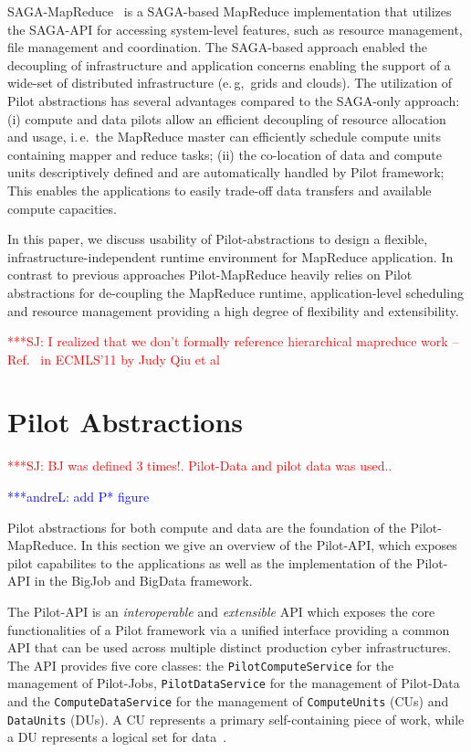 \documentclass{acm_proc_article-sp}
\newcommand{\jhanote}[1]{ {\textcolor{red} { ***SJ: #1 }}}
\newcommand{\alnote}[1]{ {\textcolor{blue} { ***andreL: #1 }}}
\newcommand{\pnote}[1]{ {\textcolor{magenta} { ***pradeep: #1 }}}
\newcommand{\alnote}[1]{}
\newcommand{\pnote}[1]{}
\newcommand{\jhanote}[1]{}
\newcommand{\upp}{\vspace*{-0.5em}}
\newcommand{\pilot}{Pilot\xspace}
\newcommand{\pilotmapreduce}{Pilot-MapReduce\xspace}
\begin{document}
SAGA-MapReduce~\cite{Sehgal:2011:UAI:1945091.1945329} is a SAGA-based
MapReduce implementation that utilizes the SAGA-API for accessing system-level
features, such as resource management, file management and coordination. The
SAGA-based approach enabled the decoupling of infrastructure and application
concerns enabling the support of a wide-set of distributed infrastructure
(e.\,g,\ grids and clouds). The utilization of Pilot abstractions has several
advantages compared to the SAGA-only approach: (i) compute and data pilots
allow an efficient decoupling of resource allocation and usage, i.\,e.\ the
MapReduce master can efficiently schedule compute units containing mapper and
reduce tasks; (ii) the co-location of data and compute units descriptively
defined and are automatically handled by Pilot framework; This enables the
applications to easily trade-off data transfers and available compute
capacities.


In this paper, we discuss usability of \pilot-abstractions to design a flexible, 
infrastructure-independent runtime environment for MapReduce application. In 
contrast to previous approaches \pilotmapreduce heavily relies on \pilot 
abstractions for de-coupling the MapReduce runtime, application-level scheduling 
and resource management providing a high degree of flexibility and extensibility.

\jhanote{I realized that we don't formally reference hierarchical
  mapreduce work -- Ref.~\cite{ecmls11-mr-autodock} in ECMLS'11 by
  Judy Qiu et al}



\upp
\section{Pilot Abstractions}
\label{sec-pilot-impl}

\jhanote{BJ was defined 3 times!. Pilot-Data and pilot data was used..}

\alnote{add P* figure}

Pilot abstractions for both compute and data are the foundation of the 
\pilotmapreduce. In this section we give an overview of the Pilot-API,
which exposes pilot capabilites to the applications as well as the 
implementation of the Pilot-API in the BigJob and BigData framework.

The Pilot-API is an {\it interoperable} and {\it extensible} API which
exposes the core functionalities of a \pilot framework via a unified
interface providing a common API that can be used across multiple
distinct production cyber infrastructures.  The API provides five
core classes: the \texttt{PilotComputeService} for the management of
Pilot-Jobs, \texttt{PilotDataService} for the management of Pilot-Data
and the \texttt{ComputeDataService} for the management of
\texttt{ComputeUnits} (CUs) and \texttt{DataUnits} (DUs). 
A CU represents a primary self-containing piece of work, while a DU
represents a logical set for data~\cite{pstar-2012}.
\end{document}
